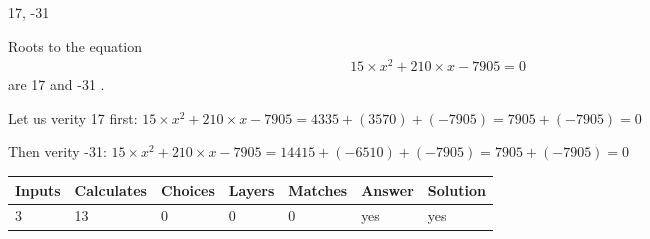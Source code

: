 \documentclass[12pt]{article}
\begin{document}
 
 
\noindent{}
 
 

17,  %
-31
 
 
 
\noindent{}
 
 

 
 
 
\noindent{}
 
 

Roots to the equation
\begin{eqnarray*}
15 \times x^2  %
+  %
210
                 \times x    %
-7905 =0
\end{eqnarray*}
are  %
17 and  %
-31 .
 
Let us verity  %
17 first:
$  %
15 \times x^2  %
+  %
210
                 \times x    %
-7905
  = %
4335+( %
3570)+( %
-7905)
  = %
7905+( %
-7905)
  = %
0
$
 
Then verity  %
-31:
$  %
15 \times x^2  %
+  %
210
                 \times x    %
-7905
  = %
14415+( %
-6510)+( %
-7905)
  = %
7905+( %
-7905)
  = %
0
$
 
 
 
\noindent{}
 
 

 
\vspace{0.3in}
   
   
   
   
\noindent\begin{tabular}{|l|l|l|l|l|l|l|}
 \hline
Inputs & Calculates & Choices & Layers & Matches & Answer & Solution \\ \hline
           3 & 
          13 & 
           0
  & 
           0 & 
           0 & 
  yes & 
  yes 
  \\ \hline
 \end{tabular}
   
   
   
   
\noindent{}
   
   
  
\end{document}
